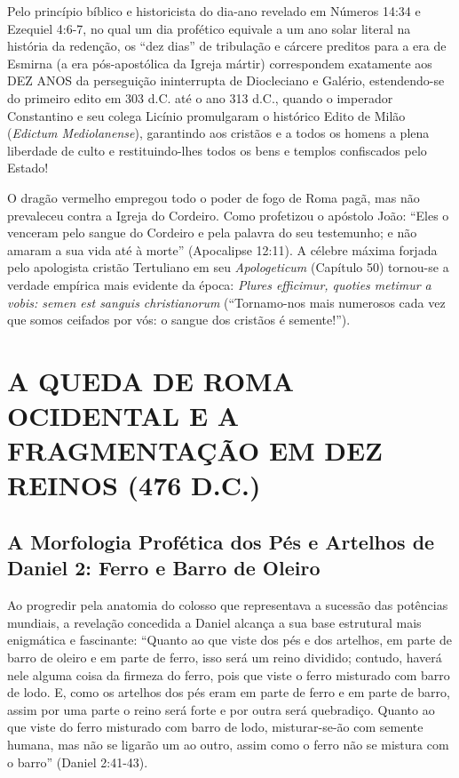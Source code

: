 Pelo princípio bíblico e historicista do dia-ano revelado em Números 14:34 e Ezequiel 4:6-7, no qual um dia profético equivale a um ano solar literal na história da redenção, os ``dez dias'' de tribulação e cárcere preditos para a era de Esmirna (a era pós-apostólica da Igreja mártir) correspondem exatamente aos DEZ ANOS da perseguição ininterrupta de Diocleciano e Galério, estendendo-se do primeiro edito em 303 d.C. até o ano 313 d.C., quando o imperador Constantino e seu colega Licínio promulgaram o histórico Edito de Milão (\textit{Edictum Mediolanense}), garantindo aos cristãos e a todos os homens a plena liberdade de culto e restituindo-lhes todos os bens e templos confiscados pelo Estado!

O dragão vermelho empregou todo o poder de fogo de Roma pagã, mas não prevaleceu contra a Igreja do Cordeiro. Como profetizou o apóstolo João: ``Eles o venceram pelo sangue do Cordeiro e pela palavra do seu testemunho; e não amaram a sua vida até à morte'' (Apocalipse 12:11). A célebre máxima forjada pelo apologista cristão Tertuliano em seu \textit{Apologeticum} (Capítulo 50) tornou-se a verdade empírica mais evidente da época: \textit{Plures efficimur, quoties metimur a vobis: semen est sanguis christianorum} (``Tornamo-nos mais numerosos cada vez que somos ceifados por vós: o sangue dos cristãos é semente!'').



\section{A QUEDA DE ROMA OCIDENTAL E A FRAGMENTAÇÃO EM DEZ REINOS (476 D.C.)}



\subsection{A Morfologia Profética dos Pés e Artelhos de Daniel 2: Ferro e Barro de Oleiro}


Ao progredir pela anatomia do colosso que representava a sucessão das potências mundiais, a revelação concedida a Daniel alcança a sua base estrutural mais enigmática e fascinante:
``Quanto ao que viste dos pés e dos artelhos, em parte de barro de oleiro e em parte de ferro, isso será um reino dividido; contudo, haverá nele alguma coisa da firmeza do ferro, pois que viste o ferro misturado com barro de lodo. E, como os artelhos dos pés eram em parte de ferro e em parte de barro, assim por uma parte o reino será forte e por outra será quebradiço. Quanto ao que viste do ferro misturado com barro de lodo, misturar-se-ão com semente humana, mas não se ligarão um ao outro, assim como o ferro não se mistura com o barro'' (Daniel 2:41-43).

